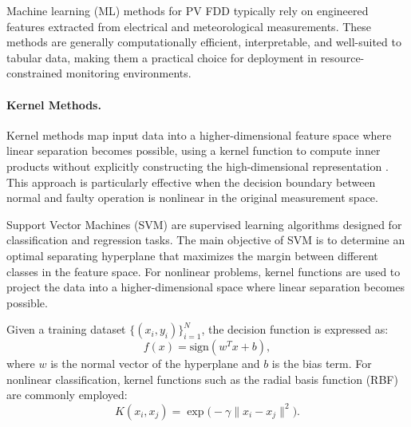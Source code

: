 Machine learning (ML) methods for PV FDD typically rely on engineered features extracted from electrical and meteorological measurements. These methods are generally computationally efficient, interpretable, and well-suited to tabular data, making them a practical choice for deployment in resource-constrained monitoring environments.

\paragraph{Kernel Methods.}
Kernel methods map input data into a higher-dimensional feature space where linear separation becomes possible, using a kernel function to compute inner products without explicitly constructing the high-dimensional representation \citep{vapnik1995nature}. This approach is particularly effective when the decision boundary between normal and faulty operation is nonlinear in the original measurement space.

Support Vector Machines (SVM) are supervised learning algorithms designed for classification and regression tasks. The main objective of SVM is to determine an optimal separating hyperplane that maximizes the margin between different classes in the feature space. For nonlinear problems, kernel functions are used to project the data into a higher-dimensional space where linear separation becomes possible.

Given a training dataset $\{(x_i,y_i)\}_{i=1}^{N}$, the decision function is expressed as:
\begin{equation}
f(x)=\text{sign}(w^Tx+b),
\end{equation}
where $w$ is the normal vector of the hyperplane and $b$ is the bias term. For nonlinear classification, kernel functions such as the radial basis function (RBF) are commonly employed:
\begin{equation}
K(x_i,x_j)=\exp\bigl(-\gamma \lVert x_i-x_j \rVert^2\bigr).
\end{equation}

